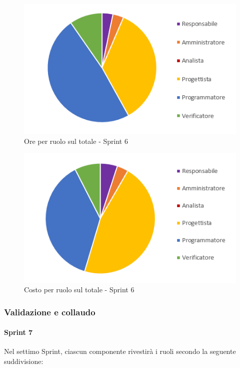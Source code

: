 \begin{figure}[H]
  \centering
  \includegraphics[scale=0.8]{immagini/5Sprint_oreRuolo.png}
  \caption{Ore per ruolo sul totale - Sprint 6}
\end{figure}

\begin{figure}[H]
  \centering
  \includegraphics[scale=0.8]{immagini/5Sprint_costoRuolo.png}
  \caption{Costo per ruolo sul totale - Sprint 6}
\end{figure}

\pagebreak


\subsubsection{Validazione e collaudo} \label{subsubsection:preventivo_validazione}
\paragraph{Sprint 7} \label{paragraph:preventivo_sprint7}
Nel settimo Sprint\glo{}, ciascun componente rivestirà i ruoli secondo la seguente suddivisione:

